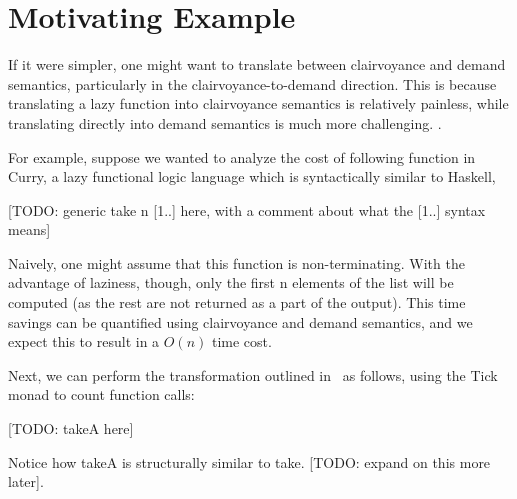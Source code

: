 \section{Motivating Example}\label{sec:motivating-example}


If it were simpler, one might want to translate between clairvoyance and demand semantics, particularly in the clairvoyance-to-demand direction. This is because translating a lazy function into clairvoyance semantics is relatively painless, while translating directly into demand semantics is much more challenging. .

For example, suppose we wanted to analyze the cost of following function in Curry, a lazy functional logic language which is syntactically similar to Haskell, 

[TODO: generic take n [1..] here, with a comment about what the [1..] syntax means]

Naively, one might assume that this function is non-terminating. With the advantage of laziness, though, only the first n elements of the list will be computed (as the rest are not returned as a part of the output). This time savings can be quantified using clairvoyance and demand semantics, and we expect this to result in a \(O(n)\) time cost.

Next, we can perform the transformation outlined
in~\cite{forking-paths} as follows, using the Tick monad to count function
calls:

[TODO: takeA here]

Notice how takeA is structurally similar to take. [TODO: expand on this more later].

